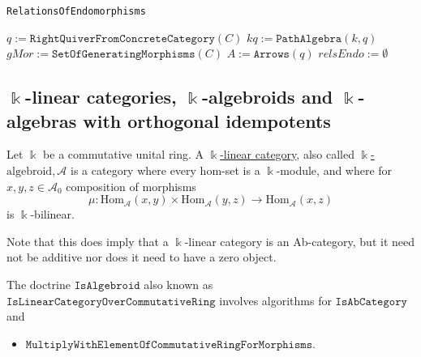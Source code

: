 \begin{algorithm}[H]\capstart
    \caption{\texttt{RelationsOfEndomorphisms}}\label{algo:RelationsOfEndomorphisms}
	\BlankLine
	$q := \mathtt{RightQuiverFromConcreteCategory}(C)$\;
	$kq := \mathtt{PathAlgebra}(k, q)$\;
	$gMor := \mathtt{SetOfGeneratingMorphisms}(C)$\;
	$A := \mathtt{Arrows}(q)$\;
	$relsEndo := \emptyset$\;
	\;
\end{algorithm}

\newpage
\subsection{$\Bbbk$-linear categories, $\Bbbk$-algebroids and $\Bbbk$-algebras with orthogonal idempotents}

\begin{definition}
Let $\Bbbk$ be a commutative unital ring. A \ul{$\Bbbk$-linear category}, also called \ul{$\Bbbk$-$\mathrm{algebroid}$},$\,\mathcal{A}$ is a
category where every hom-set is a $\Bbbk$-module, and where for $x,y,z \in \mathcal{A}_{0}$ composition of morphisms
\[
\mu : \mathrm{Hom}_{\mathcal{A}}(x,y) \times \mathrm{Hom}_{\mathcal{A}}(y,z) \rightarrow \mathrm{Hom}_{\mathcal{A}}(x,z)
\]
is $\Bbbk$-bilinear.

Note that this does imply that a $\Bbbk$-linear category is an Ab-category, but it need not be additive nor does it need to have a zero object.
\end{definition}

\begin{doctrine}
The doctrine $\mathtt{IsAlgebroid}$ also known as\\
$\mathtt{IsLinearCategoryOverCommutativeRing}$ involves algorithms for $\mathtt{IsAbCategory}$ and
\begin{itemize}
\item $\mathtt{MultiplyWithElementOfCommutativeRingForMorphisms}$.
\end{itemize}
\end{doctrine}

